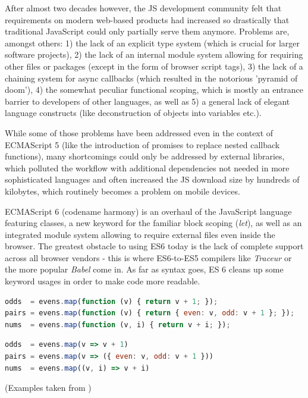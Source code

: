 	After almost two decades however, the JS development community felt that requirements on modern web-based products had increased so drastically that traditional JavaScript could only partially serve them anymore. Problems are, amongst others: 1) the lack of an explicit type system (which is crucial for larger software projects), 2) the lack of an internal module system allowing for requiring other files or packages (except in the form of browser script tags), 3) the lack of a chaining system for async callbacks (which resulted in the notorious 'pyramid of doom'), 4) the somewhat peculiar functional scoping, which is mostly an entrance barrier to developers of other languages, as well as 5) a general lack of elegant language constructs (like deconstruction of objects into variables etc.).
	
	While some of those problems have been addressed even in the context of ECMAScript 5 (like the introduction of promises to replace nested callback functions), many shortcomings could only be addressed by external libraries, which polluted the workflow with additional dependencies not needed in more sophisticated languages and often increased the JS download size by hundreds of kilobytes, which routinely becomes a problem on mobile devices.
	
	ECMAScript 6 (codename harmony) is an overhaul of the JavaScript language featuring classes, a new keyword for the familiar block scoping (\textit{let}), as well as an integrated module system allowing to require external files even inside the browser. The greatest obstacle to using ES6 today is the lack of complete support across all browser vendors - this is where ES6-to-ES5 compilers like \textit{Traceur} or the more popular \textit{Babel} come in. As far as syntax goes, ES 6 cleans up some keyword usages in order to make code more readable.	
	
	\begin{lstlisting}[caption={ECMAScript 5 (usually referred to as 'JavaScript') version of functional programming using the natively built-in mapping function.}, label={fig:ECMAScript5_mapping}, language=JavaScript]
odds  = evens.map(function (v) { return v + 1; });
pairs = evens.map(function (v) { return { even: v, odd: v + 1 }; });
nums  = evens.map(function (v, i) { return v + i; });
	\end{lstlisting}	
	
	\begin{lstlisting}[caption={ECMAScript 6 equivalent to the above code.}, label={fig:ECMAScript6_mapping}, language=JavaScript]
odds  = evens.map(v => v + 1)
pairs = evens.map(v => ({ even: v, odd: v + 1 }))
nums  = evens.map((v, i) => v + i)
	\end{lstlisting}
	(Examples taken from \citep{ES6Features})
	
